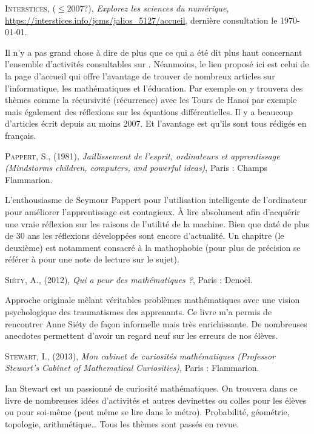 \begin{thebibliography}{99}
  \textsc{Interstices}, ($\leqslant 2007$?),
  \textit{Explorez les sciences du numérique},
  \url{https://interstices.info/jcms/jalios_5127/accueil}, dernière
  consultation le \today{}.

  Il n'y a pas grand chose à dire de plus que ce qui a été dit plus
  haut concernant l'ensemble d'activités consultables sur
  \cite{csu}. Néanmoins, le lien proposé ici est celui de la page
  d'accueil qui offre l'avantage de trouver de nombreux articles sur
  l'informatique, les mathématiques et l'éducation. Par exemple on y
  trouvera des thèmes comme la récursivité (récurrence) avec les Tours
  de Hanoï par exemple mais également des réflexions sur les équations
  différentielles. Il y a beaucoup d'articles écrit depuis au moins
  2007. Et l'avantage est qu'ils sont tous rédigés en français.

  \textsc{Pappert}, S., (1981),
  \textit{Jaillissement de l'esprit, ordinateurs et apprentissage
    (Mindstorms children, computers, and powerful ideas)},
  Paris : Champs Flammarion.

  L'enthousiasme de Seymour Pappert pour l'utilisation intelligente de
  l'ordinateur pour améliorer l'apprentissage est contagieux. \`A lire
  absolument afin d'acquérir une vraie réflexion sur les raisons de
  l'utilité de la machine. Bien que daté de plus de 30 ans les
  réflexions développées sont encore d'actualité. Un chapitre (le
  deuxième) est notamment consacré à la mathophobie (pour plus de précision se
  référer à \cite{garnier3} pour une note de lecture sur le sujet).

  \textsc{Siéty}, A., (2012),
  \textit{Qui a peur des mathématiques ?},
  Paris : Denoël.

  Approche originale mêlant véritables problèmes mathématiques avec
  une vision psychologique des traumatismes des apprenants. Ce livre
  m'a permis de rencontrer Anne Siéty de façon informelle mais très
  enrichissante. De nombreuses anecdotes permettent d'avoir un regard
  neuf sur les erreurs de nos élèves.

  \textsc{Stewart}, I., (2013),
  \textit{Mon cabinet de curiosités mathématiques (Professor Stewart's
  Cabinet of Mathematical Curiosities)},
  Paris : Flammarion.

  Ian Stewart est un passionné de curiosité mathématiques. On trouvera
  dans ce livre de nombreuses idées d'activités et autres devinettes
  ou colles pour les élèves ou pour soi-même (peut même se lire dans
  le métro). Probabilité, géométrie,
  topologie, arithmétique\dots\xspace Tous les thèmes sont passés en revue.



\end{thebibliography}
